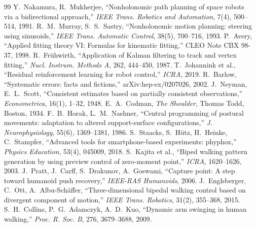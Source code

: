 \documentclass[paper=a4paper,fontsize=10pt,twocolumn,column_gap=2zw,line_length=24zw,number_of_lines=46,head_space=20mm]{jlreq}
\begin{document}
\begin{thebibliography}{99}
 Y.~Nakamura, R.~Mukherjee, ``Nonholonomic path planning of space robots via a bidirectional approach,'' \textit{IEEE Trans. Robotics and Automation}, 7(4), 500--514, 1991.
 R.~M.~Murray, S.~S.~Sastry, ``Nonholonomic motion planning: steering using sinusoids,'' \textit{IEEE Trans. Automatic Control}, 38(5), 700--716, 1993.
 P.~Avery, ``Applied fitting theory VI: Formulas for kinematic fitting,'' CLEO Note CBX 98-37, 1998.
 R.~Frühwirth, ``Application of Kalman filtering to track and vertex fitting,'' \textit{Nucl. Instrum. Methods A}, 262, 444--450, 1987.
 T.~Johannink et al., ``Residual reinforcement learning for robot control,'' \textit{ICRA}, 2019.
 R.~Barlow, ``Systematic errors: facts and fictions,'' arXiv:hep-ex/0207026, 2002.
 J.~Neyman, E.~L.~Scott, ``Consistent estimates based on partially consistent observations,'' \textit{Econometrica}, 16(1), 1--32, 1948.
 E.~A.~Codman, \textit{The Shoulder}, Thomas Todd, Boston, 1934.
 F.~B.~Horak, L.~M.~Nashner, ``Central programming of postural movements: adaptation to altered support-surface configurations,'' \textit{J. Neurophysiology}, 55(6), 1369--1381, 1986.
 S.~Staacks, S.~Hütz, H.~Heinke, C.~Stampfer, ``Advanced tools for smartphone-based experiments: phyphox,'' \textit{Physics Education}, 53(4), 045009, 2018.
 S.~Kajita et al., ``Biped walking pattern generation by using preview control of zero-moment point,'' \textit{ICRA}, 1620--1626, 2003.
 J.~Pratt, J.~Carff, S.~Drakunov, A.~Goswami, ``Capture point: A step toward humanoid push recovery,'' \textit{IEEE-RAS Humanoids}, 2006.
 J.~Englsberger, C.~Ott, A.~Albu-Sch\"affer, ``Three-dimensional bipedal walking control based on divergent component of motion,'' \textit{IEEE Trans. Robotics}, 31(2), 355--368, 2015.
 S.~H.~Collins, P.~G.~Adamczyk, A.~D.~Kuo, ``Dynamic arm swinging in human walking,'' \textit{Proc. R. Soc. B}, 276, 3679--3688, 2009.
\end{thebibliography}
\end{document}
